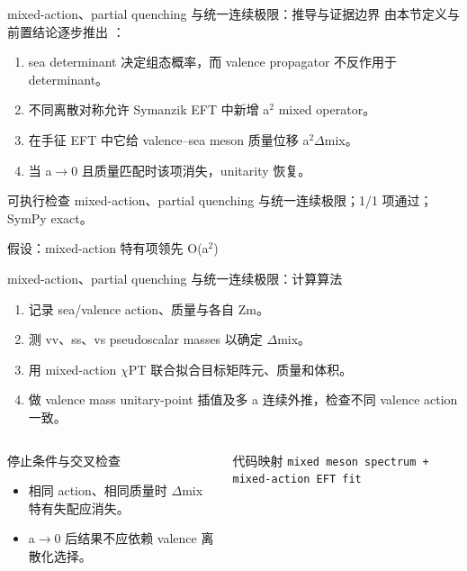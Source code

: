 \begin{frame}[t]{mixed-action、partial quenching 与统一连续极限：推导与证据边界}
\footnotesize
{}\quad 由本节定义与前置结论逐步推出 ：
\begin{enumerate}
\item sea determinant 决定组态概率，而 valence propagator 不反作用于 determinant。
\item 不同离散对称允许 Symanzik EFT 中新增 a\ensuremath{^{2}} mixed operator。
\item 在手征 EFT 中它给 valence--sea meson 质量位移 a\ensuremath{^{2}}\ensuremath{\Delta}mix。
\item 当 a\ensuremath{\rightarrow}0 且质量匹配时该项消失，unitarity 恢复。
\end{enumerate}\begin{block}{可执行检查}
\quad mixed-action、partial quenching 与统一连续极限；1/1 项通过；SymPy exact。
\par\scriptsize 假设：mixed-action 特有项领先 O(a\ensuremath{^{2}})
\end{block}
\end{frame}

\begin{frame}[t]{mixed-action、partial quenching 与统一连续极限：计算算法}
\footnotesize
{}\begin{enumerate}
\item 记录 sea/\allowbreak{}valence action、质量与各自 Zm。
\item 测 vv、ss、vs pseudoscalar masses 以确定 \ensuremath{\Delta}mix。
\item 用 mixed-action \ensuremath{\chi}PT 联合拟合目标矩阵元、质量和体积。
\item 做 valence mass unitary-point 插值及多 a 连续外推，检查不同 valence action 一致。
\end{enumerate}\begin{columns}[T,onlytextwidth]
\begin{block}{停止条件与交叉检查}\scriptsize\begin{itemize}
\item[\CheckMark] 相同 action、相同质量时 \ensuremath{\Delta}mix 特有失配应消失。
\item[\CheckMark] a\ensuremath{\rightarrow}0 后结果不应依赖 valence 离散化选择。
\end{itemize}\end{block}
\begin{block}{代码映射}
\scriptsize \texttt{mixed meson spectrum + mixed-action EFT fit}
\end{block}\end{columns}\end{frame}

